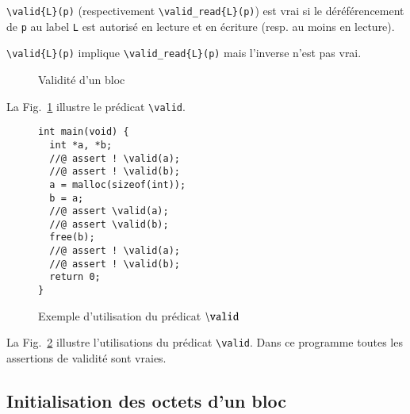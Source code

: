 \documentclass[french]{spimufcphdthesis}
\begin{document}
\lstinline'\valid{L}(p)' (respectivement \lstinline'\valid_read{L}(p)') est vrai
si le déréférencement de \lstinline{p} au label \lstinline{L} est autorisé en
lecture et en écriture (resp. au moins en lecture).

\lstinline'\valid{L}(p)' implique \lstinline'\valid_read{L}(p)'
mais l'inverse n'est pas vrai.




\begin{figure}[h]
  \begin{center}
  \end{center}
  \caption{Validité d'un bloc}
  \label{fig:valid}
\end{figure}

La Fig.~\ref{fig:valid} illustre le prédicat \lstinline{\valid}.

\begin{figure}[h]
\begin{lstlisting}
int main(void) {
  int *a, *b;
  //@ assert ! \valid(a);
  //@ assert ! \valid(b);
  a = malloc(sizeof(int));
  b = a;
  //@ assert \valid(a);
  //@ assert \valid(b);
  free(b);
  //@ assert ! \valid(a);
  //@ assert ! \valid(b);
  return 0;
}
\end{lstlisting}
\caption{Exemple d'utilisation du prédicat ${\tt \backslash valid}$}
\label{fig:valid-example}
\end{figure}

La Fig.~\ref{fig:valid-example} illustre l'utilisations du prédicat
\lstinline{\valid}. Dans ce programme toutes les assertions de validité
sont vraies.


\subsection{Initialisation des octets d'un bloc}
\end{document}
